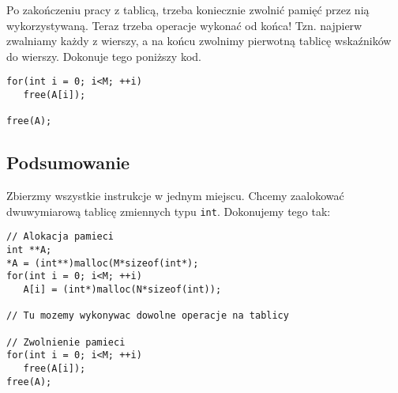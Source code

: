 \documentclass{instrukcja}
\begin{document}
Po zakończeniu pracy z tablicą, trzeba koniecznie zwolnić pamięć przez nią wykorzystywaną. Teraz trzeba operacje wykonać od końca! Tzn. najpierw zwalniamy każdy z wierszy, a na końcu zwolnimy pierwotną tablicę wskaźników do wierszy. Dokonuje tego poniższy kod.
\begin{verbatim}
for(int i = 0; i<M; ++i)
   free(A[i]);

free(A);
\end{verbatim}

\subsection*{Podsumowanie}
Zbierzmy wszystkie instrukcje w jednym miejscu. Chcemy zaalokować dwuwymiarową tablicę zmiennych typu {\tt int}. Dokonujemy tego tak:
\begin{verbatim}
// Alokacja pamieci
int **A;
*A = (int**)malloc(M*sizeof(int*);
for(int i = 0; i<M; ++i)
   A[i] = (int*)malloc(N*sizeof(int));

// Tu mozemy wykonywac dowolne operacje na tablicy

// Zwolnienie pamieci
for(int i = 0; i<M; ++i)
   free(A[i]);
free(A);
\end{verbatim}
\end{document}

